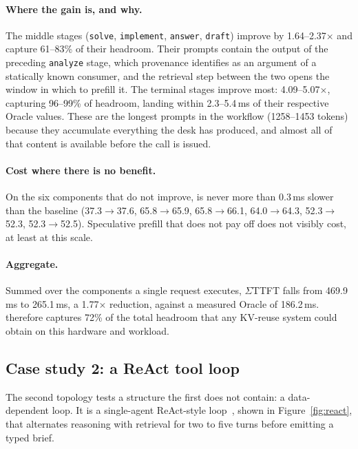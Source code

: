 \paragraph{Where the gain is, and why.} The middle stages
(\texttt{solve}, \texttt{implement}, \texttt{answer}, \texttt{draft}) improve by
1.64--2.37$\times$ and capture 61--83\% of their headroom. Their prompts contain
the output of the preceding \texttt{analyze} stage, which provenance identifies
as an argument of a statically known consumer, and the retrieval step between the
two opens the window in which to prefill it. The terminal stages improve most:
4.09--5.07$\times$, capturing 96--99\% of headroom, landing within
2.3--5.4\,ms of their respective Oracle values. These are the longest prompts in the workflow
(1258--1453 tokens) because they accumulate everything the desk has produced, and
almost all of that content is available before the call is issued.

\paragraph{Cost where there is no benefit.} On the six components that do not
improve, \sysname{} is never more than 0.3\,ms slower than the baseline
(37.3$\rightarrow$37.6, 65.8$\rightarrow$65.9, 65.8$\rightarrow$66.1,
64.0$\rightarrow$64.3, 52.3$\rightarrow$52.3, 52.3$\rightarrow$52.5). Speculative
prefill that does not pay off does not visibly cost, at least at this scale.

\paragraph{Aggregate.} Summed over the components a single request executes,
\(\Sigma\)TTFT falls from 469.9\,ms to 265.1\,ms, a 1.77$\times$ reduction, against
a measured Oracle of 186.2\,ms. \sysname{} therefore captures 72\% of the total
headroom that any KV-reuse system could obtain on this hardware and workload.

\subsection{Case study 2: a ReAct tool loop}

The second topology tests a structure the first does not contain: a
data-dependent loop. It is a single-agent ReAct-style
loop~\cite{yao2023react}, shown in Figure~\ref{fig:react}, that alternates
reasoning with retrieval for two to five turns before emitting a typed brief.

